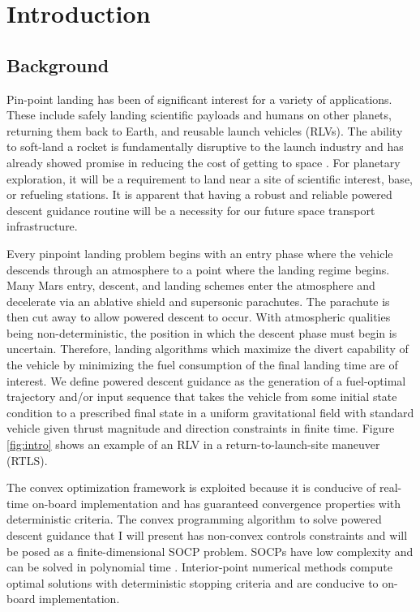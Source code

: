 \chapter{Introduction}
\label{introchap}

\section{Background}
Pin-point landing has been of significant interest for a variety of applications. These include safely landing scientific payloads and humans on other planets, returning them back to Earth, and reusable launch vehicles (RLVs). The ability to soft-land a rocket is fundamentally disruptive to the launch industry and has already showed promise in reducing the cost of getting to space \cite{jones2018recent}. For planetary exploration, it will be a requirement to land near a site of scientific interest, base, or refueling stations. It is apparent that having a robust and reliable powered descent guidance routine will be a necessity for our future space transport infrastructure.

Every pinpoint landing problem begins with an entry phase where the vehicle descends through an atmosphere to a point where the landing regime begins. Many Mars entry, descent, and landing schemes enter the atmosphere and decelerate via an ablative shield and supersonic parachutes. The parachute is then cut away to allow powered descent to occur. With atmospheric qualities being non-deterministic, the position in which the descent phase must begin is uncertain. Therefore, landing algorithms which maximize the divert capability of the vehicle by minimizing the fuel consumption of the final landing time are of interest. We define powered descent guidance as the generation of a fuel-optimal trajectory and/or input sequence that takes the vehicle from some initial state condition to a prescribed final state in a uniform gravitational field with standard vehicle given thrust magnitude and direction constraints in finite time. Figure \ref{fig:intro} shows an example of an RLV in a return-to-launch-site maneuver (RTLS).

The convex optimization framework is exploited because it is conducive of real-time on-board implementation and has guaranteed convergence properties with deterministic criteria. The convex programming algorithm to solve powered descent guidance that I will present has non-convex controls constraints and will be posed as a finite-dimensional SOCP problem. SOCPs have low complexity and can be solved in polynomial time \cite{boyd2004convex}. Interior-point numerical methods compute optimal solutions with deterministic stopping criteria and are conducive to on-board implementation.

